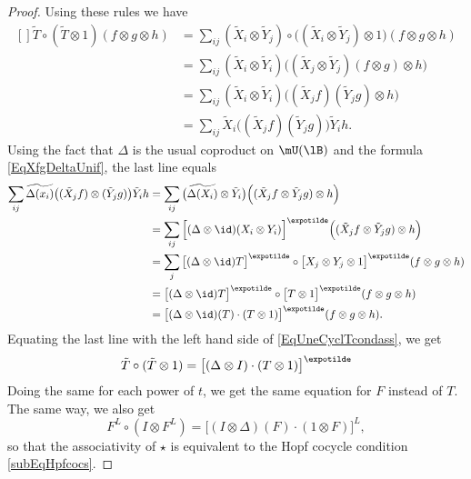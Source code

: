 \begin{proof}
	Using these rules we have
	\begin{equation}		\label{EqUneCyclTcondass}
		\begin{aligned}[]
			\tilde T\circ(\tilde T\otimes 1)(f\otimes g\otimes h)&=\sum_{ij}(\tilde X_i\otimes\tilde Y_j)\circ
							\Big( (\tilde X_i\otimes\tilde Y_j)\otimes 1 \Big)(f\otimes g\otimes h)\\
			&=\sum_{ij}(\tilde X_i\otimes\tilde Y_i)\Big( (\tilde X_j\otimes\tilde Y_j)(f\otimes g)\otimes h \Big)\\
			&=\sum_{ij}(\tilde X_i\otimes\tilde Y_i)\Big( (\tilde X_jf)(\tilde Y_jg)\otimes h \Big)\\
			&=\sum_{ij}\tilde X_i\Big( (\tilde X_jf)(\tilde Y_jg) \Big)\tilde Y_ih.
		\end{aligned}
	\end{equation}
	Using the fact that $\Delta$ is the usual coproduct on $\mU(\lB)$ and the formula \eqref{EqXfgDeltaUnif}, the last line equals
	\begin{equation}	\label{EqExpijPqsDex}
		\begin{aligned}[]
			\sum_{ij}\widetilde{\Delta(x_i)}\big( (\tilde X_jf)\otimes(\tilde Y_jg) \big)\tilde Y_ih&=\sum_{ij}\big( \widetilde{\Delta(X_i)}\otimes \tilde Y_i \big)\Big( (\tilde X_jf\otimes\tilde Y_jg)\otimes h \Big)\\
			&=\sum_{ij}\Big[ (\Delta\otimes \id)(X_i\otimes Y_i)\Big]^{\expotilde}   \Big( (\tilde X_jf\otimes\tilde Y_jg)\otimes h \Big)\\
			&=\sum_j\big[ (\Delta\otimes \id)T \big]^{\expotilde}\circ\big[ X_j\otimes Y_j\otimes 1 \big]^{\expotilde}(f\otimes g\otimes h)\\
			&=\big[ (\Delta\otimes \id)T \big]^{\expotilde}\circ\big[ T\otimes 1 \big]^{\expotilde}(f\otimes g\otimes h)\\
			&=\big[ (\Delta\otimes\id)(T)\cdot(T\otimes 1) \big]^{\expotilde}(f\otimes g\otimes h).
		\end{aligned}
	\end{equation}
	Equating the last line with the left hand side of \eqref{EqUneCyclTcondass}, we get
	\begin{equation}
		\tilde T\circ(\tilde T\otimes 1)=\big[ (\Delta\otimes I)\cdot (T\otimes 1) \big]^{\expotilde}
	\end{equation}
	Doing the same for each power of $t$, we get the same equation for $F$ instead of $T$. The same way, we also get
	\begin{equation}
		F^L\circ(I\otimes F^L)=\big[ (I\otimes\Delta)(F)\cdot(1\otimes F) \big]^L,
	\end{equation}
	so that the associativity of $\star$ is equivalent to the Hopf cocycle condition \eqref{subEqHpfcocs}.


\end{proof}

